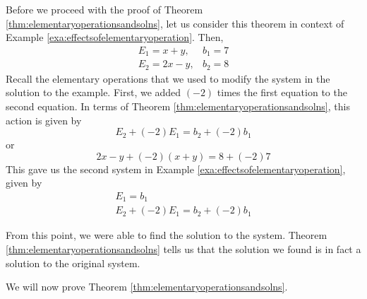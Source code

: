 Before we proceed with the proof of Theorem \ref{thm:elementaryoperationsandsolns}, 
let us consider this theorem in context of Example \ref{exa:effectsofelementaryoperation}. Then,
\begin{equation*}
\begin{array}{cc}
E_{1} = x+y, & b_{1} = 7 \\
E_{2} = 2x-y, & b_{2} = 8 
\end{array}
\end{equation*}
Recall the elementary operations that we used to modify the system in the solution to the example. 
First, we added $\left( -2 \right)$ times the first equation to the second equation.
In terms of Theorem \ref{thm:elementaryoperationsandsolns}, this action is given by
\begin{equation*}
E_{2} + \left( -2 \right) E_{1} = b_{2} + \left( -2 \right)b_{1}
\end{equation*}
or
\begin{equation*}
2x-y + \left( -2 \right) \left(x+y \right) = 8 + \left( -2 \right) 7
\end{equation*}
This gave us the second system in Example \ref{exa:effectsofelementaryoperation}, given by 
\begin{equation*}
\begin{array}{c}
E_{1} = b_{1} \\
E_{2} + \left( -2 \right) E_{1} = b_{2} + \left( -2 \right) b_{1}
\end{array}
\end{equation*}

From this point, we were able to 
find the solution to the system. Theorem \ref{thm:elementaryoperationsandsolns} tells us that the solution we 
found is in fact a solution to the original system.

We will now prove Theorem \ref{thm:elementaryoperationsandsolns}.

